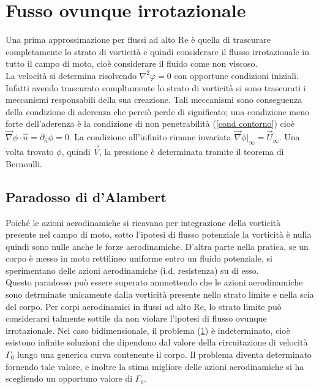 \documentclass[11pt,a4paper]{report}
\begin{document}
	\section{Fusso ovunque irrotazionale}	\label{flux ov irr}
	Una prima approssimazione per flussi ad alto Re è quella di trascurare completamente lo strato di vorticità e quindi considerare il flusso irrotazionale in tutto il campo di moto, cioè considerare il fluido come non viscoso.\\
	La velocità si determina risolvendo $\nabla^2\varphi=0$ con opportune condizioni iniziali. Infatti avendo trascurato compltamente lo strato di vorticità si sono trascurati i meccanismi responsabili della sua creazione. Tali meccanismi sono conseguenza della condizione di aderenza che perciò perde di significato; una condizione meno forte dell'aderenza è la condizione di non penetrabilità (\ref{cond contorno}) cioè $\vec\nabla\phi\cdot\hat n=\partial_{\hat n}\phi=0$. La condizione all'infinito rimane invariata $\vec\nabla\phi\vert_\infty=\vec U_\infty$. Una volta trovato $\phi$, quindi $\vec V$, la pressione è determinata tramite il teorema di Bernoulli.
		\subsection{Paradosso di d'Alambert}
		Poiché le azioni aerodinamiche si ricavano per integrazione della vorticità presente nel campo di moto, sotto l'ipotesi di flusso potenziale la vorticità è nulla quindi sono nulle anche le forze aerodinamiche. D'altra parte nella pratica, se un corpo è messo in moto rettilineo uniforme entro un fluido potenziale, si sperimentano delle azioni aerodinamiche (i.d. resistenza) su di esso.\\
		Questo paradosso può essere superato ammettendo che le azioni aerodinamiche sono detrminate unicamente dalla vorticità presente nello strato limite e nella scia del corpo. Per corpi aerodinamici in flussi ad alto Re, lo strato limite può considerarsi talmente sottile da non violare l'ipotesi di flusso ovunque irrotazionale.
		Nel caso bidimensionale, il problema (\ref{flux ov irr}) è indeterminato, cioè esistono infinite soluzioni che dipendono dal valore della circuitazione di velocità $\Gamma_0$ lungo una generica curva contenente il corpo. Il problema diventa determinato fornendo tale valore, e inoltre la stima migliore delle azioni aerodinamiche si ha scegliendo un opportuno valore di $\Gamma_0$.
	
\end{document}
